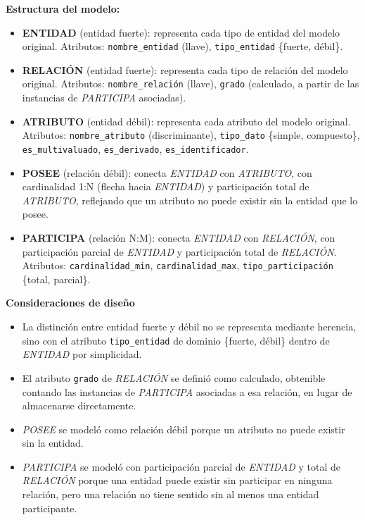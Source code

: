 \textbf{Estructura del modelo:}

\begin{itemize}
    \item \textbf{ENTIDAD} (entidad fuerte): representa cada tipo de entidad del modelo original. Atributos: \texttt{nombre\_entidad} (llave), \texttt{tipo\_entidad} \{fuerte, débil\}.
    \item \textbf{RELACIÓN} (entidad fuerte): representa cada tipo de relación del modelo original. Atributos: \texttt{nombre\_relación} (llave), \texttt{grado} (calculado, a partir de las instancias de \textit{PARTICIPA} asociadas).
    \item \textbf{ATRIBUTO} (entidad débil): representa cada atributo del modelo original. Atributos: \texttt{nombre\_atributo} (discriminante), \texttt{tipo\_dato} \{simple, compuesto\}, \texttt{es\_multivaluado}, \texttt{es\_derivado}, \texttt{es\_identificador}.
    \item \textbf{POSEE} (relación débil): conecta \textit{ENTIDAD} con \textit{ATRIBUTO}, con cardinalidad 1:N (flecha hacia \textit{ENTIDAD}) y participación total de \textit{ATRIBUTO}, reflejando que un atributo no puede existir sin la entidad que lo posee.
    \item \textbf{PARTICIPA} (relación N:M): conecta \textit{ENTIDAD} con \textit{RELACIÓN}, con participación parcial de \textit{ENTIDAD} y participación total de \textit{RELACIÓN}. Atributos: \texttt{cardinalidad\_min}, \texttt{cardinalidad\_max}, \texttt{tipo\_participación} \{total, parcial\}.
\end{itemize}

\textbf{Consideraciones de diseño}

\begin{itemize}
    \item La distinción entre entidad fuerte y débil no se representa mediante herencia, sino con el atributo \texttt{tipo\_entidad} de dominio \{fuerte, débil\} dentro de \textit{ENTIDAD} por simplicidad.
    \item El atributo \texttt{grado} de \textit{RELACIÓN} se definió como calculado, obtenible contando las instancias de \textit{PARTICIPA} asociadas a esa relación, en lugar de almacenarse directamente.
    \item \textit{POSEE} se modeló como relación débil porque un atributo no puede existir sin la entidad.
      \item \textit{PARTICIPA} se modeló con participación parcial de \textit{ENTIDAD} y total de \textit{RELACIÓN} porque una entidad puede existir sin participar en ninguna relación, pero una relación no tiene sentido sin al menos una entidad participante.
\end{itemize}